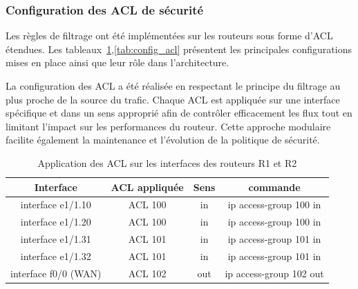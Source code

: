 \documentclass[12pt,a4paper, oneside]{memoir}
\begin{document}
\subsubsection{Configuration des ACL de sécurité}

Les règles de filtrage ont été implémentées sur les routeurs sous forme d’ACL étendues. Les tableaux~\ref{tab:acl_interfaces},\ref{tab:config_acl} présentent les principales configurations mises en place ainsi que leur rôle dans l’architecture.

La configuration des ACL a été réalisée en respectant le principe du filtrage au plus proche de la source du trafic. Chaque ACL est appliquée sur une interface spécifique et dans un sens approprié afin de contrôler efficacement les flux tout en limitant l’impact sur les performances du routeur. Cette approche modulaire facilite également la maintenance et l’évolution de la politique de sécurité.

\begin{table}[H]
	\centering
	\renewcommand{\arraystretch}{1.3}
	\begin{tabular}{|c|c|c|c|}
		\hline
		\textbf{Interface} & \textbf{ACL appliquée} & \textbf{Sens} & \textbf{commande}\\
		\hline
		interface e1/1.10 & ACL 100 & in & ip access-group 100 in\\
		\hline
		interface e1/1.20 & ACL 100 & in & ip access-group 100 in\\
		\hline
		interface e1/1.31 & ACL 101 & in & ip access-group 101 in\\
		\hline
		interface e1/1.32 & ACL 101 & in & ip access-group 101 in\\
		\hline
		interface f0/0 (WAN) & ACL 102 & out & ip access-group 102 out\\
		\hline
	\end{tabular}
	\caption{Application des ACL sur les interfaces des routeurs R1 et R2}
	\label{tab:acl_interfaces}
\end{table}
\end{document}
